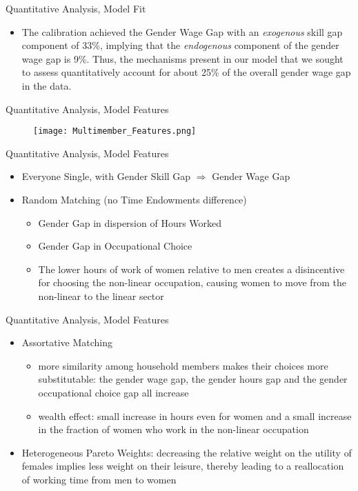 \documentclass[hyperref={bookmarks=false}]{beamer}
\begin{document}
\begin{frame}{Quantitative Analysis, Model Fit}
\begin{itemize}
\setlength{\itemsep}{0.25 cm}
\item The calibration achieved the Gender Wage Gap with an \emph{exogenous} skill gap component of 33\%, implying that the \emph{endogenous} component of the gender wage gap is 9\%. Thus, the mechanisms present in our model that we sought to assess quantitatively account for about 25\% of the overall gender wage gap in the data.
\end{itemize}
\end{frame}

\begin{frame}{Quantitative Analysis, Model Features}
\begin{figure}[!t]
\centering
\begin{minipage}[b]{0.65\textwidth}{}
\centering
\texttt{[image: Multimember\_Features.png]}
\end{minipage}
\end{figure}
\end{frame}

\begin{frame}{Quantitative Analysis, Model Features}
\begin{itemize}
\setlength{\itemsep}{0.25 cm}
\item Everyone Single, with Gender Skill Gap $\Rightarrow$ Gender Wage Gap
\item Random Matching (no Time Endowments difference)
\begin{itemize}
\item Gender Gap in dispersion of Hours Worked
\item Gender Gap in Occupational Choice
\item The lower hours of work of women relative to men creates a disincentive for choosing the non-linear occupation, causing women to move from the non-linear to the linear sector
\end{itemize}
\end{itemize}
\end{frame}

\begin{frame}{Quantitative Analysis, Model Features}
\begin{itemize}
\setlength{\itemsep}{0.25 cm}
\item Assortative Matching
\begin{itemize}
\item more similarity among household members makes their choices more substitutable: the gender wage gap, the gender hours gap and the gender occupational choice gap all increase
\item wealth effect: small increase in hours even for women and a small increase in the fraction of women who work in the non-linear occupation
\end{itemize}
\item Heterogeneous Pareto Weights: decreasing the relative weight on the utility of females implies less weight on their leisure, thereby leading to a reallocation of working time from men to women
\end{itemize}
\end{frame}
\end{document}
